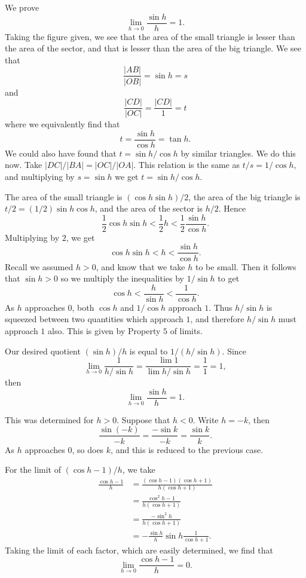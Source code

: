 We prove
\[\lim_{h\to0} \frac{\sin h}{h} = 1.\]
Taking the figure given, we see that the area of the small triangle is lesser than the area of the sector, and that is lesser than the area of the big triangle. We see that
\[\frac{|AB|}{|OB|} = \sin h = s\]
and
\[\frac{|CD|}{|OC|} = \frac{|CD|}{1} = t\]
where we equivalently find that
\[t = \frac{\sin h}{\cos h} = \tan h.\]
We could also have found that $t = \sin h/\cos h$ by similar triangles. We do this now. Take $|DC|/|BA| = |OC|/|OA|$.
This relation is the same as $t/s = 1/\cos h$, and multiplying by $s = \sin h$ we get $t = \sin h/\cos h$.

The area of the small triangle is $(\cos h \sin h)/2$, the area of the big triangle is $t/2 = (1/2)\sin h \cos h$, and the area of the sector is $h/2$. Hence
\[\frac{1}{2} \cos h \sin h < \frac{1}{2} h < \frac{1}{2} \frac{\sin h}{\cos h}.\]
Multiplying by $2$, we get
\[\cos h \sin h < h <\frac{\sin h}{\cos h}.\]
Recall we assumed $h > 0$, and know that we take $h$ to be small. Then it follows that $\sin h > 0$ so we multiply the inequalities by $1/\sin h$ to get
\[\cos h < \frac{h}{\sin h} < \frac{1}{\cos h}.\]
As $h$ approaches $0$, both $\cos h$ and $1/\cos h$ approach $1$. Thus $h/\sin h$ is squeezed between two quantities which approach $1$, and therefore $h/\sin h$ must approach $1$ also. This is given by Property $5$ of limits.

Our desired quotient $(\sin h)/h$ is equal to $1/(h/\sin h)$. Since
\[\lim_{h\to0} \frac{1}{h/\sin h} = \frac{\lim 1}{\lim h/\sin h} = \frac{1}{1} = 1,\]
then
\[\lim_{h\to0} \frac{\sin h}{h} = 1.\]

This was determined for $h > 0$. Suppose that $h < 0$. Write $h = -k$, then
\[\frac{\sin(-k)}{-k} = \frac{-\sin k}{-k} = \frac{\sin k}{k}.\]
As $h$ approaches $0$, so does $k$, and this is reduced to the previous case.

For the limit of $(\cos h -1)/h$, we take
\begin{align*}
  \frac{\cos h - 1}{h} &= \frac{(\cos h -1)(\cos h + 1)}{h(\cos h + 1)}\\
  &= \frac{\cos ^2 h - 1}{h(\cos h + 1)}\\
  &= \frac{-\sin ^2 h}{h(\cos h + 1)}\\
  &= -\frac{\sin h}{h} \sin h \frac{1}{\cos h + 1}.
\end{align*}
Taking the limit of each factor, which are easily determined, we find that
\[\lim_{h\to0} \frac{\cos h -1}{h} = 0.\]
